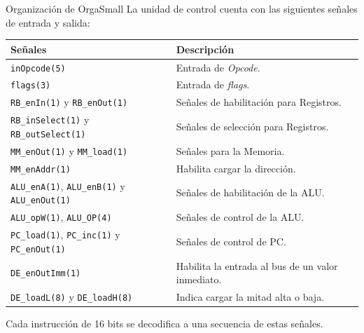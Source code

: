 \documentclass[aspectratio=169]{beamer}
\begin{document}
\begin{frame}[fragile,t]{Organización de OrgaSmall}
La unidad de control cuenta con las siguientes señales de entrada y salida:\\
\begin{center}
\small
\begin{tabular}{l|p{7cm}}
\textbf{Señales} & \textbf{Descripción} \\
\hline
\texttt{inOpcode(5)}                                                 & Entrada de \emph{Opcode}.\\
\texttt{flags(3)}                                                    & Entrada de \emph{flags}.\\
\hline
\texttt{RB\_enIn(1)} y \texttt{RB\_enOut(1)}                         & Señales de habilitación para Registros.\\
\texttt{RB\_inSelect(1)} y \texttt{RB\_outSelect(1)}                 & Señales de selección para Registros.\\
\hline
\texttt{MM\_enOut(1)} y \texttt{MM\_load(1)}                         & Señales para la Memoria.\\
\texttt{MM\_enAddr(1)}                                               & Habilita cargar la dirección.\\
\hline
\texttt{ALU\_enA(1)}, \texttt{ALU\_enB(1)} y \texttt{ALU\_enOut(1)}  & Señales de habilitación de la ALU.\\
\texttt{ALU\_opW(1)}, \texttt{ALU\_OP(4)}                            & Señales de control de la ALU.\\
\hline
\texttt{PC\_load(1)}, \texttt{PC\_inc(1)} y \texttt{PC\_enOut(1)}    & Señales de control de PC.\\
\hline
\texttt{DE\_enOutImm(1)}                                             & Habilita la entrada al bus de un valor inmediato.\\
\texttt{DE\_loadL(8)} y \texttt{DE\_loadH(8)}                        & Indica cargar la mitad alta o baja.\\
\hline
\end{tabular}
\end{center}
Cada instrucción de 16 bits se decodifica a una secuencia de estas señales.
\end{frame}
\end{document}
